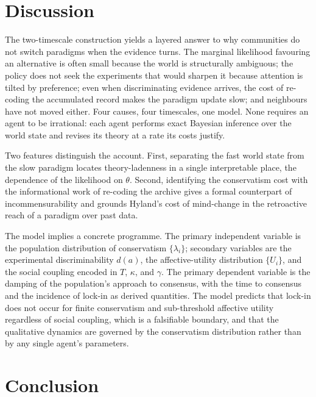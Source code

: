 \documentclass[11pt,a4paper]{article}
\newcommand{\theory}{\theta}
\begin{document}
\section{Discussion}
\label{sec:discussion}

The two-timescale construction yields a layered answer to why communities do not
switch paradigms when the evidence turns. The marginal likelihood favouring an
alternative is often small because the world is structurally ambiguous; the policy
does not seek the experiments that would sharpen it because attention is tilted by
preference; even when discriminating evidence arrives, the cost of re-coding the
accumulated record makes the paradigm update slow; and neighbours have not moved
either. Four causes, four timescales, one model. None requires an agent to be
irrational: each agent performs exact Bayesian inference over the world state and
revises its theory at a rate its costs justify.

Two features distinguish the account. First, separating the fast world state from
the slow paradigm locates theory-ladenness in a single
interpretable place, the dependence of the likelihood on $\theory$. Second,
identifying the conservatism cost with the informational work of re-coding the
archive gives a formal counterpart of incommensurability and grounds Hyland's cost
of mind-change in the retroactive reach of a paradigm over past data.

The model implies a concrete programme. The primary independent variable is the
population distribution of conservatism $\{\lambda_i\}$; secondary variables are the
experimental discriminability $d(a)$, the affective-utility distribution $\{U_i\}$,
and the social coupling encoded in $T$, $\kappa$, and $\gamma$. The primary
dependent variable is the damping of the population's approach to consensus, with
the time to consensus and the incidence of lock-in as derived quantities. The model
predicts that lock-in does not occur for finite conservatism and sub-threshold
affective utility regardless of social coupling, which is a falsifiable boundary,
and that the qualitative dynamics are governed by the conservatism distribution
rather than by any single agent's parameters.

\section{Conclusion}
\label{sec:conclusion}
\end{document}
